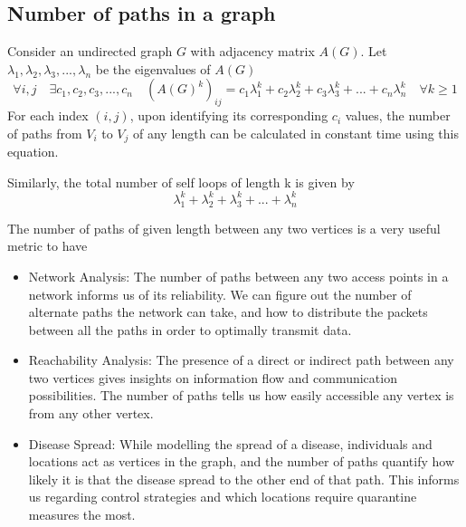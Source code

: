 \documentclass[12pt, a4paper]{article}
\begin{document}
    \subsection{Number of paths in a graph \cite{mitpaths}}
    \begin{flushleft}
    Consider an undirected graph $G$ with adjacency matrix $A(G)$. Let $\lambda_1,\lambda_2,\lambda_3,...,\lambda_n$ be the eigenvalues of $A(G)$
      $$\forall i,j \quad \exists c_1,c_2,c_3,...,c_n \quad (A(G)^k)_{ij} = c_1\lambda_1^k + c_2\lambda_2^k + c_3\lambda_3^k + ... + c_n\lambda_n^k \quad \forall k \ge 1$$
      For each index $(i, j)$, upon identifying its corresponding $c_i$ values, the number of paths from $V_i$ to $V_j$ of any length can be calculated in constant time using this equation.

      Similarly, the total number of self loops of length k is given by
      $$\lambda_1^k + \lambda_2^k + \lambda_3^k + ... + \lambda_n^k$$

      The number of paths of given length between any two vertices is a very useful metric to have
      \begin{itemize}
        \item Network Analysis: The number of paths between any two access points in a network informs us of its reliability. We can figure out the number of alternate paths the network can take, and how to distribute the packets between all the paths in order to optimally transmit data.

        \item Reachability Analysis: The presence of a direct or indirect path between any two vertices gives insights on information flow and communication possibilities. The number of paths tells us how easily accessible any vertex is from any other vertex.

        \item Disease Spread: While modelling the spread of a disease, individuals and locations act as vertices in the graph, and the number of paths quantify how likely it is that the disease spread to the other end of that path. This informs us regarding control strategies and which locations require quarantine measures the most.
      \end{itemize}
    \end{flushleft} 
\end{document}
